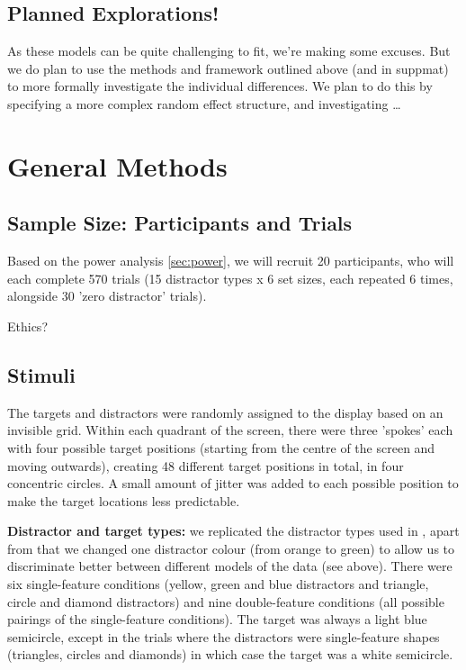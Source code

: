 \documentclass[smallextended, natbib]{svjour3}       %
\begin{document}
\subsection{Planned Explorations!}

As these models can be quite challenging to fit, we're making some excuses. But we do plan to use the methods and framework outlined above (and in suppmat) to more formally investigate the individual differences. We plan to do this by specifying a more complex random effect structure, and investigating \ldots

\section{General Methods}

\subsection{Sample Size: Participants and Trials}

Based on the power analysis \ref{sec:power}, we will recruit 20 participants, who will each
complete 570 trials (15 distractor types x 6 set sizes, each repeated 6 times, alongside 30 'zero distractor' trials).

Ethics?

\subsection{Stimuli}

The targets and distractors were randomly assigned to the display based on an invisible grid. Within each quadrant of the screen, there were three 'spokes' each with four possible target positions (starting from the centre of the screen and moving outwards), creating 48 different target positions in total, in four concentric circles. A small amount of jitter was added to each possible position to make the target locations less predictable.

\textbf{Distractor and target types:} we replicated the distractor types used in \cite{buetti2019predicting}, apart from that we changed one distractor colour (from orange to green) to allow us to discriminate better between different models of the data (see above). There were six single-feature conditions (yellow, green and blue distractors and triangle, circle and diamond distractors) and nine double-feature conditions (all possible pairings of the single-feature conditions). The target was always a light blue semicircle, except in the trials where the distractors were single-feature shapes (triangles, circles and diamonds) in which case the target was a white semicircle.
\end{document}
